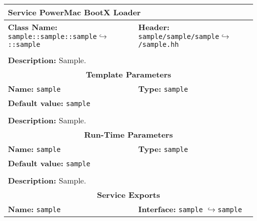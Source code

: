\newpage
\begin{center}
	\begin{tabular}{|p{7.5cm}|p{7.5cm}|}
		\hline
		\multicolumn{2}{|l|}{\textbf{\Large Service PowerMac BootX Loader}}\\
		\hline
		\multicolumn{1}{|p{7.5cm}}{\textbf{Class Name:} \newline \texttt{sample::sample::sample}\newline$\hookrightarrow$\texttt{::sample}} & \multicolumn{1}{p{7.5cm}|}{\textbf{Header:} \newline \texttt{sample/sample/sample}\newline$\hookrightarrow$\texttt{/sample.hh}}\\
		\multicolumn{2}{|l|}{}\\
		\multicolumn{2}{|p{15cm}|}{\textbf{Description:} \newline Sample.}\\
		\hline
		\hline
		\multicolumn{2}{|c|}{\textbf{\large Template Parameters}}\\
		\hline
		\multicolumn{1}{|p{7.5cm}}{\textbf{Name:} \texttt{sample}} & \multicolumn{1}{p{7.5cm}|}{\textbf{Type:} \texttt{sample}}\\
		\multicolumn{2}{|p{15cm}|}{\textbf{Default value:} \texttt{sample}}\\
		\multicolumn{2}{|l|}{}\\
		\multicolumn{2}{|p{15cm}|}{\textbf{Description:} \newline Sample.}\\
		\hline
		\hline
		\multicolumn{2}{|c|}{\textbf{\large Run-Time Parameters}}\\
		\hline
		\multicolumn{1}{|p{7.5cm}}{\textbf{Name:} \texttt{sample}} & \multicolumn{1}{p{7.5cm}|}{\textbf{Type:} \texttt{sample}}\\
		\multicolumn{2}{|p{15cm}|}{\textbf{Default value:} \texttt{sample}}\\
		\multicolumn{2}{|l|}{}\\
		\multicolumn{2}{|p{15cm}|}{\textbf{Description:} \newline Sample.}\\
		\hline
		\hline
		\multicolumn{2}{|c|}{\textbf{\large Service Exports}}\\
		\hline
		\multicolumn{1}{|p{7.5cm}}{\textbf{Name:} \texttt{sample}} & \multicolumn{1}{p{7.5cm}|}{\textbf{Interface:} \newline \texttt{sample} \newline$\hookrightarrow$\texttt{sample}}\\

\end{tabular}
\end{center}
